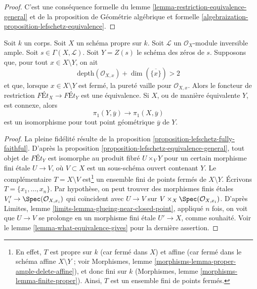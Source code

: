 \begin{proof}
C'est une conséquence formelle du
lemme \ref{lemma-restriction-equivalence-general} et de la
proposition de Géométrie algébrique et formelle
\ref{algebraization-proposition-lefschetz-equivalence}.
\end{proof}

\begin{proposition}
\label{proposition-lefschetz-equivalence}
Soit $k$ un corps. Soit $X$ un schéma propre sur $k$.
Soit $\mathcal{L}$ un $\mathcal{O}_X$-module inversible ample.
Soit $s \in \Gamma(X, \mathcal{L})$. Soit $Y = Z(s)$ le
schéma des zéros de $s$.
Supposons que, pour tout $x \in X \setminus Y$, on ait
$$
\text{depth}(\mathcal{O}_{X, x}) + \dim(\overline{\{x\}}) > 2
$$
et que, lorsque $x \in X \setminus Y$ est fermé, la pureté vaille pour
$\mathcal{O}_{X, x}$. Alors le foncteur de restriction
$\textit{F\'Et}_X \to \textit{F\'Et}_Y$
est une équivalence. Si $X$, ou de manière équivalente $Y$, est connexe, alors
$$
\pi_1(Y, \overline{y}) \to \pi_1(X, \overline{y})
$$
est un isomorphisme pour tout point géométrique $\overline{y}$ de $Y$.
\end{proposition}

\begin{proof}
La pleine fidélité résulte de la
proposition \ref{proposition-lefschetz-fully-faithful}.
D'après la proposition \ref{proposition-lefschetz-equivalence-general},
tout objet de $\textit{F\'Et}_Y$
est isomorphe au produit fibré $U \times_V Y$ pour un certain
morphisme fini étale $U \to V$, où $V \subset X$
est un sous-schéma ouvert contenant $Y$.
Le complémentaire $T = X \setminus V$
est\footnote{En effet, $T$ est propre sur $k$ (car fermé dans $X$)
et affine (car fermé dans le schéma affine $X \setminus Y$ ; voir
Morphismes, lemme \ref{morphisms-lemma-proper-ample-delete-affine}),
et donc fini sur $k$
(Morphismes, lemme \ref{morphisms-lemma-finite-proper}).
Ainsi, $T$ est un ensemble fini de points fermés.}
un ensemble fini de points fermés de $X \setminus Y$.
Écrivons $T = \{x_1, \ldots, x_n\}$.
Par hypothèse, on peut trouver des morphismes finis étales
$V'_i \to \Spec(\mathcal{O}_{X, x_i})$ qui coïncident avec
$U \to V$ sur $V \times_X \Spec(\mathcal{O}_{X, x_i})$.
D'après Limites, lemme \ref{limits-lemma-glueing-near-closed-point},
appliqué $n$ fois, on voit que $U \to V$ se prolonge en un morphisme fini étale
$U' \to X$, comme souhaité.
Voir le lemme \ref{lemma-what-equivalence-gives} pour la dernière assertion.
\end{proof}










